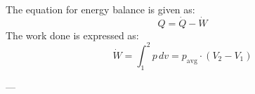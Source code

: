 The equation for energy balance is given as:  
\[
Q = \dot{Q} - \dot{W}
\]  
The work done is expressed as:  
\[
\dot{W} = \int_{1}^{2} p \, dv = p_{\text{avg}} \cdot (V_2 - V_1)
\]  

---